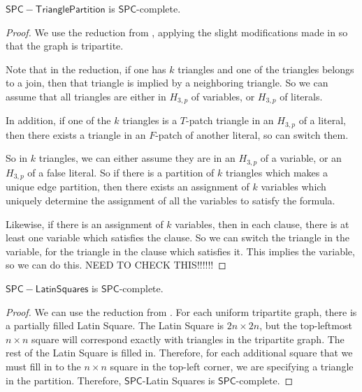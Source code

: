 \documentclass[runningheads,a4paper]{llncs}
\begin{document}
\begin{proposition}
$\mathsf{SPC-Triangle Partition}$ is $\mathsf{SPC}$-complete.
\end{proposition}

\begin{proof}
We use the reduction from \cite{holyer1981np}, applying the slight modifications made in \cite{colbourn1984complexity} so that the graph is tripartite. 

Note that in the reduction, if one has $k$ triangles and one of the triangles belongs to a join, then that triangle is implied by a neighboring triangle. So we can assume that all triangles are either in $H_{3,p}$ of variables, or $H_{3,p}$ of literals. 

In addition, if one of the $k$ triangles is a $T$-patch triangle in an $H_{3,p}$ of a literal, then there exists a triangle in an $F$-patch of another literal, so can switch them.

So in $k$ triangles, we can either assume they are in an $H_{3,p}$ of a variable, or an $H_{3,p}$ of a false literal. So if there is a partition of $k$ triangles which makes a unique edge partition, then there exists an assignment of $k$ variables which uniquely determine the assignment of all the variables to satisfy the formula. 

Likewise, if there is an assignment of $k$ variables, then in each clause, there is at least one variable which satisfies the clause. So we can switch the triangle in the variable, for the triangle in the clause which satisfies it. This implies the variable, so we can do this. NEED TO CHECK THIS!!!!!!
\end{proof}

\begin{corollary}
$\mathsf{SPC-Latin Squares}$ is $\mathsf{SPC}$-complete.
\end{corollary}

\begin{proof}
We can use the reduction from \cite{colbourn1984complexity}. For each uniform tripartite graph, there is a partially filled Latin Square. The Latin Square is $2n \times 2n$, but the top-leftmost $n \times n$ square will correspond exactly with triangles in the tripartite graph. The rest of the Latin Square is filled in. Therefore, for each additional square that we must fill in to the $n \times n$ square in the top-left corner, we are specifying a triangle in the partition. Therefore, $\mathsf{SPC}$-Latin Squares is $\mathsf{SPC}$-complete.
\end{proof}
\end{document}
